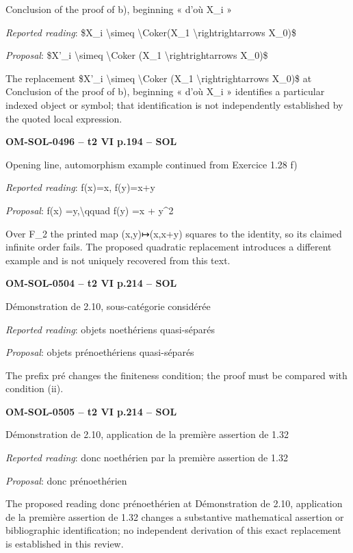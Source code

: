 Conclusion of the proof of b), beginning « d'où X\_i »\par
\emph{Reported reading}: \$X\_i \textbackslash{}simeq \textbackslash{}Coker(X\_1 \textbackslash{}rightrightarrows X\_0)\$\par
\emph{Proposal}: \$X'\_i \textbackslash{}simeq \textbackslash{}Coker (X\_1 \textbackslash{}rightrightarrows X\_0)\$\par
The replacement \$X'\_i \textbackslash{}simeq \textbackslash{}Coker (X\_1 \textbackslash{}rightrightarrows X\_0)\$ at Conclusion of the proof of b), beginning « d'où X\_i » identifies a particular indexed object or symbol; that identification is not independently established by the quoted local expression.\par
\par\noindent\textbf{OM-SOL-0496 -- t2 VI p.194 -- SOL}\par
Opening line, automorphism example continued from Exercice 1.28 f)\par
\emph{Reported reading}: f(x)=\allowbreak x, f(y)=\allowbreak x+y\par
\emph{Proposal}: f(x) =\allowbreak  y,\textbackslash{}qquad f(y) =\allowbreak  x + y\textasciicircum{}2\par
Over F\_2 the printed map (x,y)↦(x,x+y) squares to the identity, so its claimed infinite order fails. The proposed quadratic replacement introduces a different example and is not uniquely recovered from this text.\par
\par\noindent\textbf{OM-SOL-0504 -- t2 VI p.214 -- SOL}\par
Démonstration de 2.10, sous-catégorie considérée\par
\emph{Reported reading}: objets noethériens quasi-séparés\par
\emph{Proposal}: objets prénoethériens quasi-séparés\par
The prefix pré changes the finiteness condition; the proof must be compared with condition (ii).\par
\par\noindent\textbf{OM-SOL-0505 -- t2 VI p.214 -- SOL}\par
Démonstration de 2.10, application de la première assertion de 1.32\par
\emph{Reported reading}: donc noethérien par la première assertion de 1.32\par
\emph{Proposal}: donc prénoethérien\par
The proposed reading donc prénoethérien at Démonstration de 2.10, application de la première assertion de 1.32 changes a substantive mathematical assertion or bibliographic identification; no independent derivation of this exact replacement is established in this review.\par
